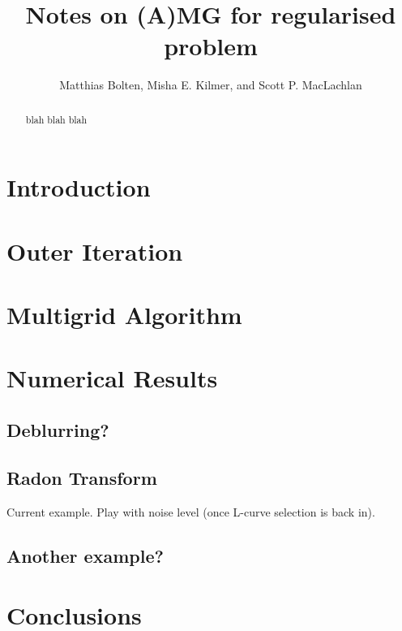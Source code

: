 \documentclass{article}
\title{Notes on (A)MG for regularised problem}
\author{Matthias Bolten, Misha E. Kilmer, and Scott P. MacLachlan}
\begin{document}
\maketitle

\begin{abstract}
blah blah blah
\end{abstract}


\section{Introduction}


\section{Outer Iteration}


\section{Multigrid Algorithm}



\section{Numerical Results}

\subsection{Deblurring?}

\subsection{Radon Transform}

Current example.  Play with noise level (once L-curve selection is
back in).

\subsection{Another example?}

\section{Conclusions}

 
\end{document}
